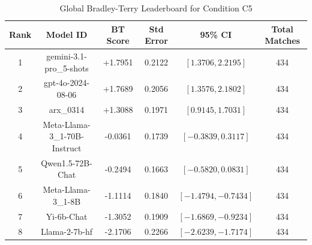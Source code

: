 \begin{table}[ht]
\centering
\caption{Global Bradley-Terry Leaderboard for Condition \textsc{C5}}
\label{tab:leaderboard_c5}
\begin{tabular}{cccccc}
\hline
\textbf{Rank} & \textbf{Model ID} & \textbf{BT Score} & \textbf{Std Error} & \textbf{95\% CI} & \textbf{Total Matches} \\
\hline
1 & gemini-3.1-pro\_5-shots & +1.7951 & 0.2122 & $[1.3706, 2.2195]$ & 434 \\
2 & gpt-4o-2024-08-06 & +1.7689 & 0.2056 & $[1.3576, 2.1802]$ & 434 \\
3 & arx\_0314 & +1.3088 & 0.1971 & $[0.9145, 1.7031]$ & 434 \\
4 & Meta-Llama-3\_1-70B-Instruct & -0.0361 & 0.1739 & $[-0.3839, 0.3117]$ & 434 \\
5 & Qwen1.5-72B-Chat & -0.2494 & 0.1663 & $[-0.5820, 0.0831]$ & 434 \\
6 & Meta-Llama-3\_1-8B & -1.1114 & 0.1840 & $[-1.4794, -0.7434]$ & 434 \\
7 & Yi-6b-Chat & -1.3052 & 0.1909 & $[-1.6869, -0.9234]$ & 434 \\
8 & Llama-2-7b-hf & -2.1706 & 0.2266 & $[-2.6239, -1.7174]$ & 434 \\
\hline
\end{tabular}
\end{table}
